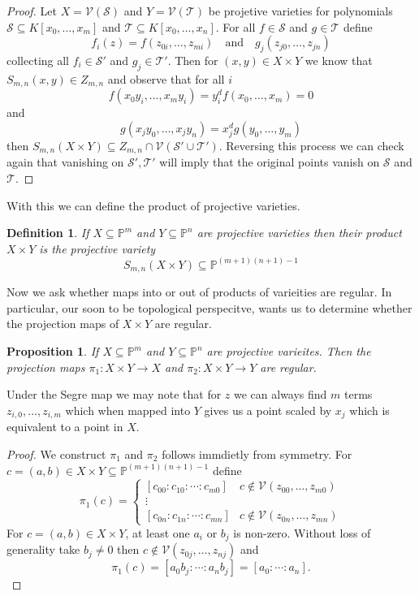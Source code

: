 \documentclass[40pt]{article}
\newtheorem{definition}{Definition}[section]
\newcommand{\mcal}[1]{\mathcal{#1}}
\newcommand{\Proj}{\mathbb{P}}
\newcommand{\V}{\mathcal{V}}
\newtheorem{proposition}{Proposition}[section]
\theoremstyle{remark}
\begin{document}
			\begin{proof}
				Let $X = \V(\mcal{S})$ and $Y = \V(\mcal{T})$ be projetive varieties for polynomials $\mcal{S} \subseteq K[x_0,\dots,x_m]$ and $\mcal{T} \subseteq K[x_0,\dots,x_n]$. For all $f \in \mcal{S}$ and $g \in \mcal{T}$ define 
				\[
				f_i(z) = f(z_{0i}, \dots, z_{mi}) \quad\text{and}\quad g_j(z_{j0},\dots, z_{jn})
				\]
				collecting all $f_i \in \mcal{S}'$ and $g_j \in \mcal{T}'$. Then for $(x,y) \in X \times Y$ we know that $S_{m,n}(x,y) \in Z_{m,n}$ and observe that for all $i$
				\[
				f(x_0y_i, \dots, x_my_i) = y_i^d f(x_0,\dots,x_m) = 0
				\]
				and 
				\[
				g(x_jy_0,\dots,x_jy_n) = x_j^dg(y_0,\dots,y_m)
				\]
				then $S_{m,n}(X \times Y) \subseteq Z_{m,n} \cap \V(\mcal{S}' \cup \mcal{T}')$. Reversing this process we can check again that vanishing on $\mcal{S}', \mcal{T}'$ will imply that the original points vanish on $\mcal{S}$ and $\mcal{T}$. 
			\end{proof}
			With this we can define the product of projective varieties.
			\begin{definition}
				If $X \subseteq \Proj^m$ and $Y \subseteq \Proj^n$ are projective varieties then their product $X \times Y$ is the projective variety 
				\[
				S_{m,n}(X \times Y) \subseteq \Proj^{(m+1)(n+1)- 1}
				\]
			\end{definition}
			Now we ask whether maps into or out of products of varieities are regular. In particular, our soon to be topological perspecitve, wants us to determine whether the projection maps of $X \times Y$ are regular.
			\begin{proposition}
				If $X \subseteq \Proj^m$ and $Y \subseteq \Proj^n$ are projective varieites. Then the projection maps $\pi_1 : X \times Y 
				\to X$ and $\pi_2 : X \times Y \to Y$ are regular. 
			\end{proposition}
			Under the Segre map we may note that for $z$ we can always find $m$ terms $z_{i,0},\dots,z_{i,m}$ which when mapped into $Y$ gives us a point scaled by $x_j$ which is equivalent to a point in $X$. 
			\begin{proof}
				We construct $\pi_1$ and $\pi_2$ follows immdietly from symmetry. For $c = (a,b) \in X \times Y \subseteq \Proj^{(m+1)(n+1)-1}$ define 
				\[
				\pi_1(c) = \begin{cases}
					[c_{00}: c_{10}: \cdots : c_{m0}] & c \not \in \V(z_{00},\dots,z_{m0}) \\
					\vdots \\
					[c_{0n}:c_{1n} : \cdots :c_{mn}] & c \not \in \V(z_{0n},\dots,z_{mn})
				\end{cases}
				\]
				For $c = (a,b) \in X \times Y$, at least one $a_i$ or $b_j$ is non-zero. Without loss of generality take $b_j \neq 0$ then $c \not \in \V(z_{0j},\dots,z_{nj})$ and 
				\[
				\pi_1(c) = [a_0b_j : \cdots :a_nb_j] = [a_0:\cdots:a_n].
				\]
			\end{proof}
\end{document}
